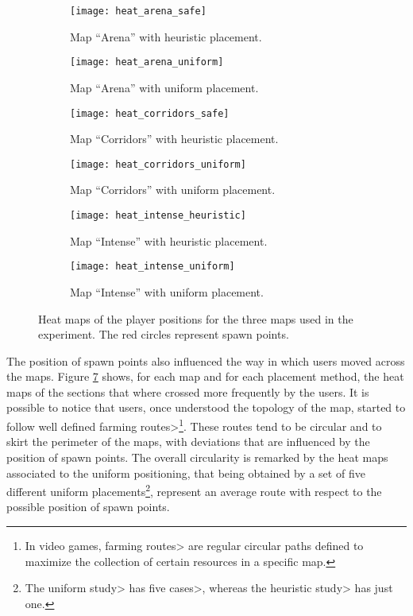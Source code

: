 \begin{figure}
	\centering
	\hfill
  	\begin{subfigure}[t]{0.385\linewidth}
		\texttt{[image: heat\_arena\_safe]}
     		\caption{Map ``Arena'' with heuristic placement.}
     		\label{img:heat_arena_safe}
 	\end{subfigure}
 	\hfill
  	\begin{subfigure}[t]{0.385\linewidth}
    		\texttt{[image: heat\_arena\_uniform]}
     		\caption{Map ``Arena'' with uniform placement.}
     		\label{img:heat_arena_uniform}
  	\end{subfigure}
  	\hfill
  	
  	\hfill
  	\begin{subfigure}[t]{0.385\linewidth}
		\texttt{[image: heat\_corridors\_safe]}
     		\caption{Map ``Corridors'' with heuristic placement.}
     		\label{img:heat_corridors_safe}
 	\end{subfigure}
 	\hfill
  	\begin{subfigure}[t]{0.385\linewidth}
    		\texttt{[image: heat\_corridors\_uniform]}
     		\caption{Map ``Corridors'' with uniform placement.}
     		\label{img:heat_corridors_uniform}
  	\end{subfigure}
 	\hfill
 	
 	\hfill
  	\begin{subfigure}[t]{0.385\linewidth}
		\texttt{[image: heat\_intense\_heuristic]}
     		\caption{Map ``Intense'' with heuristic placement.}
     		\label{img:heat_intense_heuristic}
 	\end{subfigure}
 	\hfill
  	\begin{subfigure}[t]{0.385\linewidth}
    		\texttt{[image: heat\_intense\_uniform]}
     		\caption{Map ``Intense'' with uniform placement.}
     		\label{img:heat_intense_uniform}
  	\end{subfigure}	
  	\hfill
	\caption[Heat maps of the player position for the three maps used in the experiment.]{Heat maps of the player positions for the three maps used in the experiment. The red circles represent spawn points.}
	\label{img:heat}
\end{figure}

The position of spawn points also influenced the way in which users moved across the maps. Figure \ref{img:heat} shows, for each map and for each placement method, the heat maps of the sections that where crossed more frequently by the users. It is possible to notice that users, once understood the topology of the map, started to follow well defined \<farming routes>\footnote{In video games, \<farming routes> are regular circular paths defined to maximize the collection of certain resources in a specific map.}. These routes tend to be circular and to skirt the perimeter of the maps, with deviations that are influenced by the position of spawn points. The overall circularity is remarked by the heat maps associated to the uniform positioning, that being obtained by a set of five different uniform placements\footnote{The uniform \<study> has five \<cases>, whereas the heuristic \<study> has just one.}, represent an average route with respect to the possible position of spawn points.

